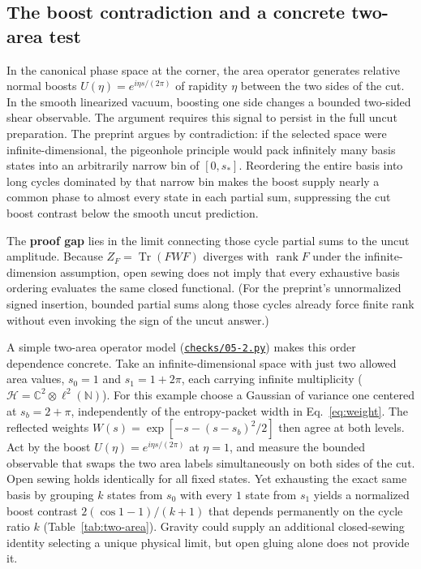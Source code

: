 \documentclass[10pt,a4paper]{article}
\newcommand{\repo}[2]{\href{https://github.com/sprajs/quantum-gravity/blob/main/#1}{#2}}
\newcommand{\tr}{\operatorname{Tr}}
\newcommand{\rank}{\operatorname{rank}}
\newcommand{\HH}{\mathcal{H}}
\begin{document}
\subsection{The boost contradiction and a concrete two-area test}
In the canonical phase space at the corner, the area operator generates relative normal boosts $U(\eta) = e^{i\eta s/(2\pi)}$ of rapidity $\eta$ between the two sides of the cut. In the smooth linearized vacuum, boosting one side changes a bounded two-sided shear observable. The argument requires this signal to persist in the full uncut preparation. The preprint argues by contradiction: if the selected space were infinite-dimensional, the pigeonhole principle would pack infinitely many basis states into an arbitrarily narrow bin of $[0, s_*]$. Reordering the entire basis into long cycles dominated by that narrow bin makes the boost supply nearly a common phase to almost every state in each partial sum, suppressing the cut boost contrast below the smooth uncut prediction.

The \textbf{proof gap} lies in the limit connecting those cycle partial sums to the uncut amplitude. Because $Z_F = \tr(FWF)$ diverges with $\rank F$ under the infinite-dimension assumption, open sewing does not imply that every exhaustive basis ordering evaluates the same closed functional. (For the preprint's unnormalized signed insertion, bounded partial sums along those cycles already force finite rank without even invoking the sign of the uncut answer.)

A simple two-area operator model (\repo{checks/05-2.py}{\texttt{checks/05-2.py}}) makes this order dependence concrete. Take an infinite-dimensional space with just two allowed area values, $s_0 = 1$ and $s_1 = 1 + 2\pi$, each carrying infinite multiplicity ($\HH = \mathbb{C}^2 \otimes \ell^2(\mathbb{N})$). For this example choose a Gaussian of variance one centered at $s_b=2+\pi$, independently of the entropy-packet width in Eq.~\eqref{eq:weight}. The reflected weights $W(s)=\exp[-s-(s-s_b)^2/2]$ then agree at both levels. Act by the boost $U(\eta) = e^{i\eta s/(2\pi)}$ at $\eta = 1$, and measure the bounded observable that swaps the two area labels simultaneously on both sides of the cut. Open sewing holds identically for all fixed states. Yet exhausting the exact same basis by grouping $k$ states from $s_0$ with every $1$ state from $s_1$ yields a normalized boost contrast $2(\cos 1 - 1)/(k + 1)$ that depends permanently on the cycle ratio $k$ (Table~\ref{tab:two-area}). Gravity could supply an additional closed-sewing identity selecting a unique physical limit, but open gluing alone does not provide it.
\end{document}

